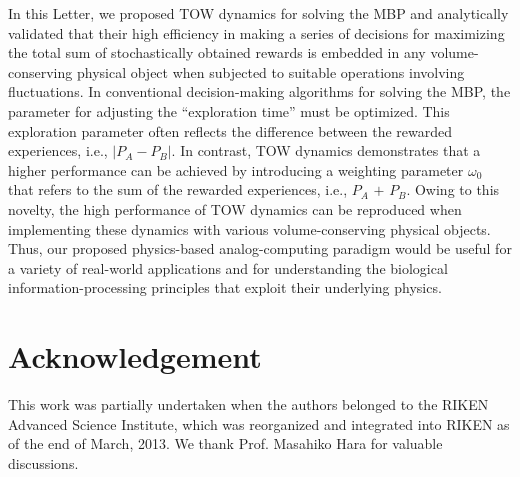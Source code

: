 \documentclass[twocolumn,showpacs,preprintnumbers,amsmath,amssymb]{revtex4}
\begin{document}
In this Letter, we proposed TOW dynamics for solving the MBP and analytically validated that their high efficiency in making a series of decisions for maximizing the total sum of stochastically obtained rewards is embedded in any volume-conserving physical object when subjected to suitable operations involving fluctuations.
In conventional decision-making algorithms for solving the MBP, the parameter for adjusting the ``exploration time'' must be optimized.
This exploration parameter often reflects the difference between the rewarded experiences, i.e., $|P_A - P_B |$.
In contrast, TOW dynamics demonstrates that a higher performance can be achieved by introducing a weighting parameter $\omega_0$ that refers to the sum of the rewarded experiences, i.e., $P_A$ $+$ $P_B$.
Owing to this novelty, the high performance of TOW dynamics can be reproduced when implementing these dynamics with various volume-conserving physical objects.
Thus, our proposed physics-based analog-computing paradigm would be useful for a variety of real-world applications and for understanding the biological information-processing principles that exploit their underlying physics.



\section*{Acknowledgement}

This work was partially undertaken when the authors belonged to the RIKEN Advanced Science Institute, which was reorganized and integrated into RIKEN as of the end of March, 2013. 
We thank Prof. Masahiko Hara for valuable discussions. 
\end{document}
